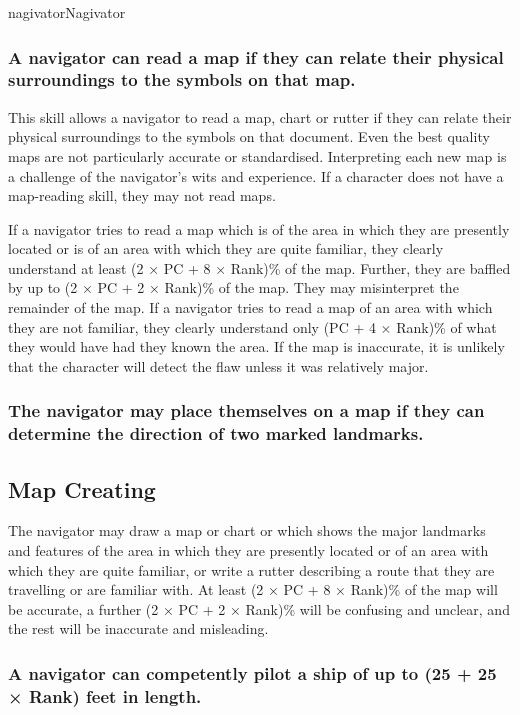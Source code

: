 \begin{Skill}[1.1]{nagivator}{Nagivator}
\subsubsection{A navigator can read a map if they can relate their physical
surroundings to the symbols on that map.}

This skill allows a navigator to read a map, chart or rutter if they
can relate their physical surroundings to the symbols on that
document.  Even the best quality maps are not particularly accurate or
standardised. Interpreting each new map is a challenge of the
navigator’s wits and experience. If a character does not have a
map-reading skill, they may not read maps.

If a navigator tries to read a map which is of the area in which they
are presently located or is of an area with which they are quite
familiar, they clearly understand at least (2 × PC + 8 × Rank)\% of
the map.  Further, they are baffled by up to (2 × PC + 2 × Rank)\% of
the map. They may misinterpret the remainder of the map.  If a
navigator tries to read a map of an area with which they are not
familiar, they clearly understand only (PC + 4 × Rank)\% of what they
would have had they known the area.  If the map is inaccurate, it is
unlikely that the character will detect the flaw unless it was
relatively major.

\subsubsection{The navigator may place themselves on a map if they can determine the direction of two marked landmarks.}

\subsection{Map Creating}

The navigator may draw a map or chart or which shows the major
landmarks and features of the area in which they are presently located
or of an area with which they are quite familiar, or write a rutter
describing a route that they are travelling or are familiar with. At
least (2 × PC + 8 × Rank)\% of the map will be accurate, a further (2
× PC + 2 × Rank)\% will be confusing and unclear, and the rest will be
inaccurate and misleading.

\subsubsection{A navigator can competently pilot a ship of up to (25 + 25 × Rank) feet in length.}


\end{Skill}
